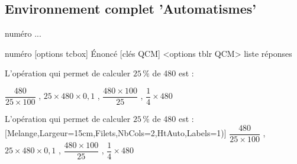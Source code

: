 \documentclass[french,11pt,a4paper]{article}
\begin{document}
\begin{demohigh}[language=latex/latex2]
\end{demohigh}

\begin{demohigh}[language=latex/latex2]
\end{demohigh}

\subsection{Environnement complet 'Automatismes'}

\begin{codehigh}[language=latex/latex2]
\begin{ExamAutomatQuest}{numéro}
...
\end{ExamAutomatQuest}
\end{codehigh}

\begin{codehigh}[language=latex/latex2]
\QuestionAutomatismes%
  {numéro}%
  [options tcbox]%
  {Énoncé}%
  [clés QCM]%
  <options tblr QCM>%
  {liste réponses}
\end{codehigh}

\begin{demohigh}[language=latex/latex2]
\begin{ExamAutomatQuest}{1}
L'opération qui permet de calculer $25\,\%$ de 480 est :\\

\medskip

\ExamReponsesQCM%
{%
  {$\dfrac{480}{25 \times 100}$} ,
  {$25 \times 480 \times 0,1$} ,
  {$\dfrac{480 \times 100}{25}$} ,
  {$\dfrac{1}{4} \times 480$}
}
\end{ExamAutomatQuest}
\end{demohigh}

\begin{demohigh}[language=latex/latex2]
{L'opération qui permet de calculer $25\,\%$ de 480 est :}
  [Melange,Largeur=15cm,Filets,NbCols=2,HtAuto,Labels={1)}]
  {%
    {$\dfrac{480}{25 \times 100}$} ,
    {$25 \times 480 \times 0,1$} ,
    {$\dfrac{480 \times 100}{25}$} ,
    {$\dfrac{1}{4} \times 480$}
}
\end{demohigh}
\end{document}
